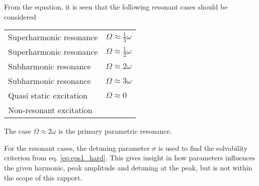 
From the equation, it is seen that the following resonant cases should be
considered

\begin{table}[!ht]\centering
  \begin{tabular}{@{$\bullet$ }ll}
    Superharmonic resonance  & $\Omega \approx \tfrac{1}{3}\omega $ \\
    Superharmonic resonance  & $\Omega \approx \tfrac{1}{2}\omega $ \\
    Subharmonic resonance  & $\Omega \approx 2\omega $ \\
    Subharmonic resonance  & $\Omega \approx 3\omega $ \\
    Quasi static excitation  & $\Omega \approx 0 $ \\
    Non-resonant excitation  & 
  \end{tabular}
\end{table}
The case $\Omega \approx 2 \omega$ is the primary parametric resonance.

For the resonant cases, the detuning parameter $\sigma$ is used to find the
solvability criterion from eq. \eqref{eq:eps1_hard}. This gives insight in how
parameters influences the given harmonic, peak amplitude and detuning at the
peak, but is not within the scope of this rapport.

